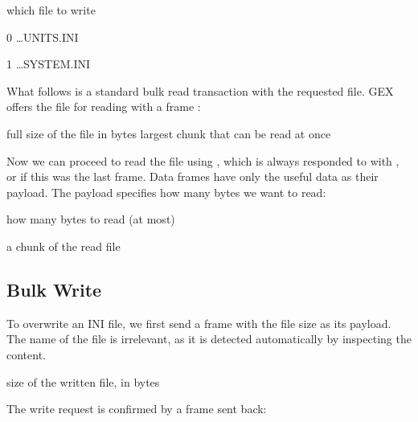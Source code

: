 \begin{boxedpayload}
	 which file to write
		\begin{pldlist}
			\item 0 \dots UNITS.INI
			\item 1 \dots SYSTEM.INI
		\end{pldlist}
\end{boxedpayload}

What follows is a standard bulk read transaction with the requested file.
GEX offers the file for reading with a frame \CmdBulkReadOffer:

\begin{boxedpayload}
	 full size of the file in bytes
	 largest chunk that can be read at once
\end{boxedpayload}

Now we can proceed to read the file using \CmdBulkReadPoll, which is always responded to with \CmdBulkData, or \CmdBulkEnd if this was the last frame. Data frames have only the useful data as their payload. The \CmdBulkReadPoll payload specifies how many bytes we want to read:

\begin{boxedpayload}
	 how many bytes to read (at most)
\end{boxedpayload}

\begin{boxedpayload}
 a chunk of the read file
\end{boxedpayload}

\subsection{Bulk Write}

To overwrite an INI file, we first send a frame \CmdINIWrite with the file size as its payload. The name of the file is irrelevant, as it is detected automatically by inspecting the content.

\begin{boxedpayload}
	 size of the written file, in bytes
\end{boxedpayload}

\noindent
The write request is confirmed by a frame \CmdBulkWriteOffer sent back:

